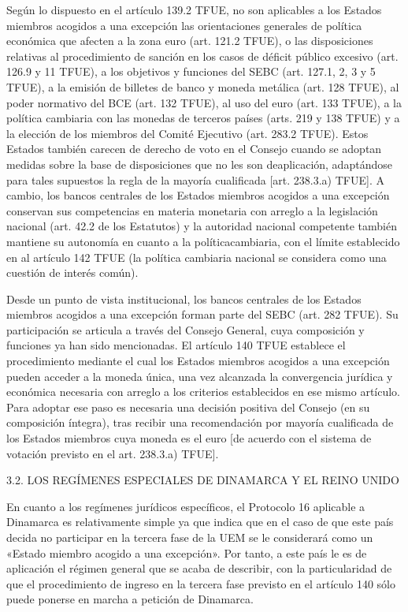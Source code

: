 \documentclass[10pt,a4paper]{article}
\begin{document}
Según lo dispuesto en el artículo 139.2 TFUE, no son aplicables a los Estados miembros acogidos a una excepción las orientaciones generales de política económica que afecten a la zona euro (art. 121.2 TFUE), o las disposiciones relativas al procedimiento de sanción en los casos de déficit público excesivo (art. 126.9 y 11 TFUE), a los objetivos y funciones del SEBC (art. 127.1, 2, 3 y 5 TFUE), a la emisión de billetes de banco y moneda metálica (art. 128 TFUE), al poder normativo del BCE (art. 132 TFUE), al uso del euro (art. 133 TFUE), a la política cambiaria con las monedas de terceros países (arts. 219 y 138 TFUE) y a la elección de los miembros del Comité Ejecutivo (art. 283.2 TFUE). Estos Estados también carecen de derecho de voto en el Consejo cuando se adoptan medidas sobre la base de disposiciones que no les son deaplicación, adaptándose para tales supuestos la regla de la mayoría cualificada [art. 238.3.a) TFUE]. A cambio, los bancos centrales de los Estados miembros acogidos a una excepción conservan sus competencias en materia monetaria con arreglo a la legislación nacional (art. 42.2 de los Estatutos) y la autoridad nacional competente también mantiene su autonomía en cuanto a la políticacambiaria, con el límite establecido en al artículo 142 TFUE (la política cambiaria nacional se considera como una cuestión de interés común).

Desde un punto de vista institucional, los bancos centrales de los Estados miembros acogidos a una excepción forman parte del SEBC (art. 282 TFUE). Su participación se articula a través del Consejo General, cuya composición y funciones ya han sido mencionadas. El artículo 140 TFUE establece el procedimiento mediante el cual los Estados miembros acogidos a una excepción pueden acceder a la moneda única, una vez alcanzada la convergencia jurídica y económica necesaria con arreglo a los criterios establecidos en ese mismo artículo. Para adoptar ese paso es necesaria una decisión positiva del Consejo (en su composición íntegra), tras recibir una recomendación por mayoría cualificada de los Estados miembros cuya moneda es el euro [de acuerdo con el sistema de votación previsto en el art. 238.3.a) TFUE].

3.2. LOS REGÍMENES ESPECIALES DE DINAMARCA Y EL REINO UNIDO

En cuanto a los regímenes jurídicos específicos, el Protocolo 16 aplicable a Dinamarca es relativamente simple ya que indica que en el caso de que este país decida no participar en la tercera fase de la UEM se le considerará como un «Estado miembro acogido a una excepción». Por tanto, a este país le es de aplicación el régimen general que se acaba de describir, con la particularidad de que el procedimiento de ingreso en la tercera fase previsto en el artículo 140 sólo puede ponerse en marcha a petición de Dinamarca.
\end{document}
